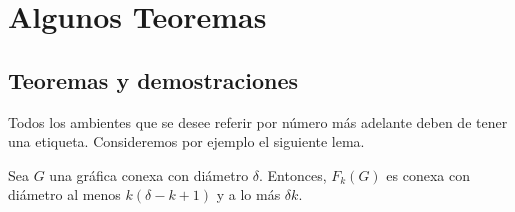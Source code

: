\chapter{Algunos Teoremas}%
\label{cap:ejemplos}

\section{Teoremas y demostraciones}%
\label{sec:etiquetas}

Todos los ambientes que se desee referir por n\'umero m\'as adelante deben de
tener una etiqueta.  Consideremos por ejemplo el siguiente lema.

\begin{teorema}%
\label{teo:primero}
Sea $G$ una gr\'afica conexa con di\'ametro $\delta$. Entonces, $F_{k}(G)$ es 
conexa con di\'ametro al menos $k(\delta -k+1)$ y a lo m\'as $\delta k$.
\end{teorema}

